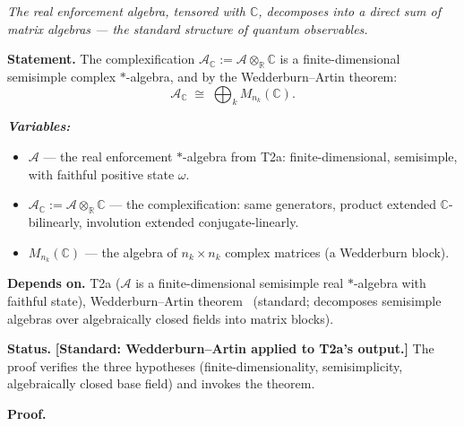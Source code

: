 \documentclass[11pt]{article}
\theoremstyle{remark}
\newenvironment{varlist}{\begin{itemize}[nosep,leftmargin=2em]}{\end{itemize}}
\begin{document}
\begin{tcolorbox}[apfbox, title={T2b: Complexification and Wedderburn Decomposition}]
\textit{The real enforcement algebra, tensored with $\mathbb{C}$, decomposes into a direct sum of matrix algebras --- the standard structure of quantum observables.}

\smallskip\noindent\textbf{Statement.}  The complexification $\mathcal{A}_\mathbb{C} :=
\mathcal{A} \otimes_\mathbb{R} \mathbb{C}$ is a finite-dimensional semisimple
complex $*$-algebra, and by the Wedderburn--Artin theorem:
\[
\mathcal{A}_\mathbb{C} \;\cong\; \bigoplus_k M_{n_k}(\mathbb{C}).
\]

\smallskip\noindent\textbf{\textit{Variables:}}
\begin{varlist}
\item $\mathcal{A}$ --- the real enforcement $*$-algebra from T2a: finite-dimensional, semisimple, with faithful positive state $\omega$.
\item $\mathcal{A}_\mathbb{C} := \mathcal{A} \otimes_\mathbb{R} \mathbb{C}$ --- the complexification: same generators, product extended $\mathbb{C}$-bilinearly, involution extended conjugate-linearly.
\item $M_{n_k}(\mathbb{C})$ --- the algebra of $n_k \times n_k$ complex matrices (a Wedderburn block).
\end{varlist}

\smallskip\noindent\textbf{Depends on.}  T2a ($\mathcal{A}$ is a finite-dimensional semisimple real $*$-algebra with faithful state), Wedderburn--Artin theorem~\cite{Wedderburn1908,Artin1927} (standard; decomposes semisimple algebras over algebraically closed fields into matrix blocks).

\smallskip\noindent\textbf{Status.}  \textbf{[Standard: Wedderburn--Artin applied to T2a's output.]}  The proof verifies the three hypotheses (finite-dimensionality, semisimplicity, algebraically closed base field) and invokes the theorem.

\smallskip\noindent\textbf{Proof.}


\end{tcolorbox}
\end{document}
